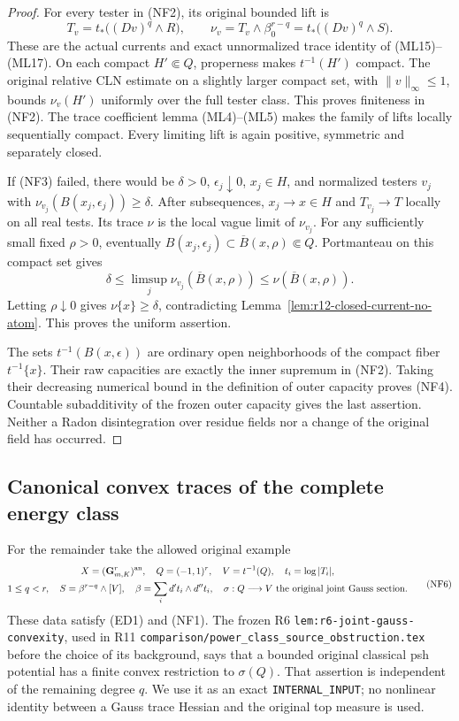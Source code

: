 \begin{proof}
For every tester in (NF2), its original bounded lift is
\[
             T_v=t_*\bigl((Dv)^q\wedge R\bigr),\qquad
             \nu_v=T_v\wedge\beta_0^{r-q}
                       =t_*\bigl((Dv)^q\wedge S\bigr).
 \tag{NF5}
\]
These are the actual currents and exact unnormalized trace
identity of (ML15)--(ML17). On each compact $H'\Subset Q$,
properness makes $t^{-1}(H')$ compact. The original relative
CLN estimate on a slightly larger compact set, with
$\|v\|_\infty\leq1$, bounds $\nu_v(H')$ uniformly over
the full tester class. This proves finiteness in (NF2).
The trace coefficient lemma (ML4)--(ML5) makes the family
of lifts locally sequentially compact. Every limiting lift
is again positive, symmetric and separately closed.

If (NF3) failed, there would be $\delta>0$,
$\epsilon_j\downarrow0$, $x_j\in H$, and normalized
testers $v_j$ with
$\nu_{v_j}(B(x_j,\epsilon_j))\geq\delta$.
After subsequences, $x_j\to x\in H$ and $T_{v_j}\to T$
locally on all real tests. Its trace $\nu$ is the local vague
limit of $\nu_{v_j}$. For any sufficiently small fixed
$\rho>0$, eventually
$B(x_j,\epsilon_j)\subset\overline B(x,\rho)\Subset Q$.
Portmanteau on this compact set gives
\[
      \delta\leq\limsup_j\nu_{v_j}(\overline B(x,\rho))
                              \leq\nu(\overline B(x,\rho)).
\]
Letting $\rho\downarrow0$ gives $\nu\{x\}\geq\delta$,
contradicting Lemma~\ref{lem:r12-closed-current-no-atom}.
This proves the uniform assertion.

The sets $t^{-1}(B(x,\epsilon))$ are ordinary open
neighborhoods of the compact fiber $t^{-1}\{x\}$.
Their raw capacities are exactly the inner supremum in
(NF2). Taking their decreasing numerical bound in the
definition of outer capacity proves (NF4). Countable
subadditivity of the frozen outer capacity gives the last
assertion. Neither a Radon disintegration over residue
fields nor a change of the original field has occurred.
\end{proof}

\subsection{Canonical convex traces of the complete energy class}

For the remainder take the allowed original example
\[
 \begin{gathered}
 X=(\mathbf G_{m,K}^{r})^{\rm an},\quad
 Q=(-1,1)^r,\quad V=t^{-1}(Q),\quad t_i=\log|T_i|,\\
 1\leq q<r,\quad S=\beta^{r-q}\wedge[V],\quad
 \beta=\sum_i d't_i\wedge d''t_i,\quad
 \sigma:Q\longrightarrow V\text{ the original joint Gauss section}.
 \end{gathered}
 \tag{NF6}
\]
These data satisfy (ED1) and (NF1). The frozen R6
\texttt{lem:r6-joint-gauss-convexity}, used in R11
\texttt{comparison/power\_class\_source\_obstruction.tex}
before the choice of its background, says that a bounded
original classical psh potential has a finite convex
restriction to $\sigma(Q)$. That assertion is independent
of the remaining degree $q$. We use it as an exact
\texttt{INTERNAL\_INPUT}; no nonlinear identity between
a Gauss trace Hessian and the original top measure is used.

